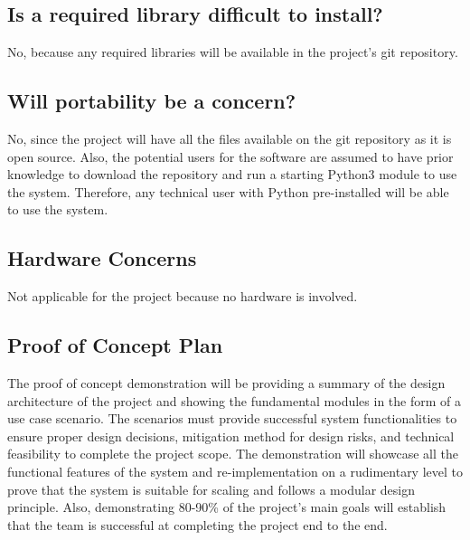 \documentclass{article}
\begin{document}
\subsection{Is a required library difficult to install?}
No, because any required libraries will be available in the project's git repository.

\subsection{Will portability be a concern?}
No, since the project will have all the files available on the git repository as it is open source. Also, the potential users for the software are assumed to have prior knowledge to download the repository and run a starting Python3 module to use the system. Therefore, any technical user with Python pre-installed will be able to use the system.

\subsection{Hardware Concerns}
Not applicable for the project because no hardware is involved. 

\subsection{Proof of Concept Plan}
The proof of concept demonstration will be providing a summary of the design architecture of the project and showing the fundamental modules in the form of a use case scenario. The scenarios must provide successful system functionalities to ensure proper design decisions, mitigation method for design risks, and technical feasibility to complete the project scope. The demonstration will showcase all the functional features of the system and re-implementation on a rudimentary level to prove that the system is suitable for scaling and follows a modular design principle. Also, demonstrating 80-90\% of the project's main goals will establish that the team is successful at completing the project end to the end.


\end{document}
